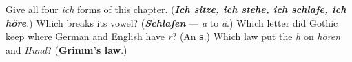 \begin{tcolorbox}[breakable,colback=teal!4,colframe=teal!35!black,title={Before you move on}]
Give all four \emph{ich} forms of this chapter. (\emph{\textbf{Ich sitze, ich stehe, ich schlafe, ich höre}}.) Which breaks its vowel? (\emph{\textbf{Schlafen}} — \emph{a} to \emph{ä}.) Which letter did Gothic keep where German and English have \emph{r}? (An \textbf{s}.) Which law put the \emph{h} on \emph{hören} and \emph{Hund}? (\textbf{Grimm's law}.)
\end{tcolorbox}
